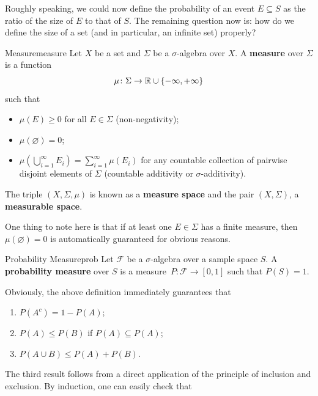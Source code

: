 \documentclass[math, code]{amznotes}
\theoremstyle{remark}
\begin{document}
Roughly speaking, we could now define the probability of an event $E \subseteq S$ as the ratio of the size of $E$ to that of $S$. The remaining question now is: how do we define the size of a set (and in particular, an infinite set) properly?
\begin{dfnbox}{Measure}{measure}
    Let $X$ be a set and $\Sigma$ be a $\sigma$-algebra over $X$. A {\color{red} \textbf{measure}} over $\Sigma$ is a function 
    \begin{equation*}
        \mu \colon \Sigma \to \mathbb{R} \cup \{-\infty, +\infty\}
    \end{equation*}
    such that 
    \begin{itemize}
        \item $\mu\left(E\right) \geq 0$ for all $E \in \Sigma$ (non-negativity);
        \item $\mu\left(\varnothing\right) = 0$;
        \item $\mu\left(\bigcup_{i = 1}^{\infty}E_i\right) = \sum_{i = 1}^{\infty}\mu\left(E_i\right)$ for any countable collection of pairwise disjoint elements of $\Sigma$ (countable additivity or $\sigma$-additivity).
    \end{itemize}
    The triple $\left(X, \Sigma, \mu\right)$ is known as a {\color{red} \textbf{measure space}} and the pair $\left(X, \Sigma\right)$, a {\color{red} \textbf{measurable space}}.
\end{dfnbox}
One thing to note here is that if at least one $E \in \Sigma$ has a finite measure, then $\mu\left(\varnothing\right) = 0$ is automatically guaranteed for obvious reasons.
\begin{dfnbox}{Probability Measure}{prob}
    Let $\mathcal{F}$ be a $\sigma$-algebra over a sample space $S$. A {\color{red} \textbf{probability measure}} over $S$ is a measure~$P \colon \mathcal{F} \to \left[0, 1\right]$ such that $P\left(S\right) = 1$.
\end{dfnbox}
Obviously, the above definition immediately guarantees that 
\begin{enumerate}
    \item $P\left(A^c\right) = 1 - P\left(A\right)$;
    \item $P\left(A\right) \leq P\left(B\right)$ if $P\left(A\right) \subseteq P\left(A\right)$;
    \item $P\left(A \cup B\right) \leq P\left(A\right) + P\left(B\right)$.
\end{enumerate}
The third result follows from a direct application of the principle of inclusion and exclusion. By induction, one can easily check that 
\end{document}
